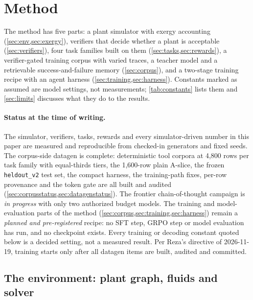\section{Method}\label{sec:method}

The method has five parts: a plant simulator with exergy accounting (\cref{sec:env,sec:exergy}), verifiers
that decide whether a plant is acceptable (\cref{sec:verifiers}), four task families built on them
(\cref{sec:tasks,sec:rewards}), a verifier-gated training corpus with varied traces, a teacher model and a
retrievable success-and-failure memory (\cref{sec:corpus}), and a two-stage training recipe with an agent harness
(\cref{sec:training,sec:harness}). Constants marked as assumed are model settings, not measurements;
\cref{tab:constants} lists them and \cref{sec:limits} discusses what they do to the results.

\paragraph{Status at the time of writing.}
The simulator, verifiers, tasks, rewards and every simulator-driven number in this paper are measured and reproducible from checked-in generators and fixed seeds. The corpus-side datagen is complete: deterministic tool corpora at 4,800 rows per task family with equal-thirds tiers, the 1,600-row plain A-slice, the frozen \texttt{heldout\_v2} test set, the compact harness, the training-path fixes, per-row provenance and the token gate are all built and audited (\cref{sec:corpusstatus,sec:datagenstatus}). The frontier chain-of-thought campaign is \emph{in progress} with only two authorized budget models. The training and model-evaluation parts of the method (\cref{sec:corpus,sec:training,sec:harness}) remain a \emph{planned and pre-registered} recipe: no SFT step, GRPO step or model evaluation has run, and no checkpoint exists. Every training or decoding constant quoted below is a decided setting, not a measured result. Per Reza's directive of 2026-11-19, training starts only after all datagen items are built, audited and committed.

\subsection{The environment: plant graph, fluids and solver}\label{sec:env}

